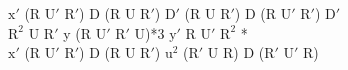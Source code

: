 $\text{x}'$ (R $\text{U}'$ $\text{R}'$) D (R U $\text{R}'$) $\text{D}'$ (R U $\text{R}'$) D (R $\text{U}'$ $\text{R}'$) $\text{D}'$\\
$\text{R}^2$ U $\text{R}'$ y (R $\text{U}'$ $\text{R}'$ U)*3 $\text{y}'$ R $\text{U}'$ $\text{R}^2$ *\\
$\text{x}'$ (R $\text{U}'$ $\text{R}'$) D (R U $\text{R}'$) $\text{u}^2$ ($\text{R}'$ U R) D ($\text{R}'$ $\text{U}'$ R)\\
